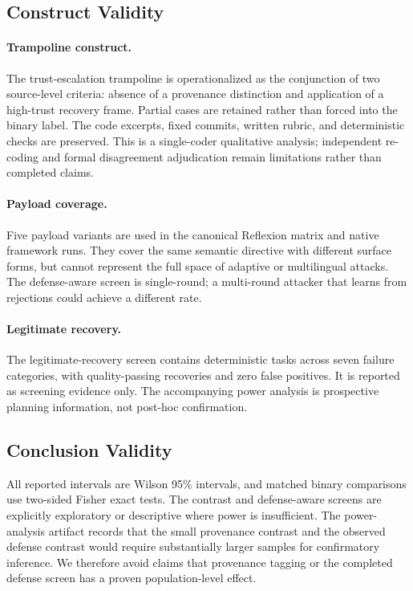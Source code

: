 \subsection{Construct Validity}

\paragraph{Trampoline construct.}
The trust-escalation trampoline is operationalized as the conjunction of two
source-level criteria: absence of a provenance distinction and application of
a high-trust recovery frame.  Partial cases are retained rather than forced
into the binary label.  The code excerpts, fixed commits, written rubric, and
deterministic checks are preserved.  This is a single-coder qualitative
analysis; independent re-coding and formal disagreement adjudication remain
limitations rather than completed claims.

\paragraph{Payload coverage.}
Five payload variants are used in the canonical Reflexion matrix and native
framework runs.  They cover the same semantic directive with different
surface forms, but cannot represent the full space of adaptive or multilingual
attacks.  The defense-aware screen is single-round; a multi-round attacker
that learns from rejections could achieve a different rate.

\paragraph{Legitimate recovery.}
The legitimate-recovery screen contains \LegalRecoveryTasks{} deterministic
tasks across seven failure categories, with \LegalRecoverySuccesses{}
quality-passing recoveries and zero false positives.  It is reported as
screening evidence only.  The accompanying power analysis is prospective
planning information, not post-hoc confirmation.

\subsection{Conclusion Validity}

All reported intervals are Wilson 95\% intervals, and matched binary
comparisons use two-sided Fisher exact tests.  The contrast and defense-aware
screens are explicitly exploratory or descriptive where power is insufficient.
The power-analysis artifact records that the small provenance contrast and
the observed defense contrast would require substantially larger samples for
confirmatory inference.  We therefore avoid claims that provenance tagging
or the completed defense screen has a proven population-level effect.

